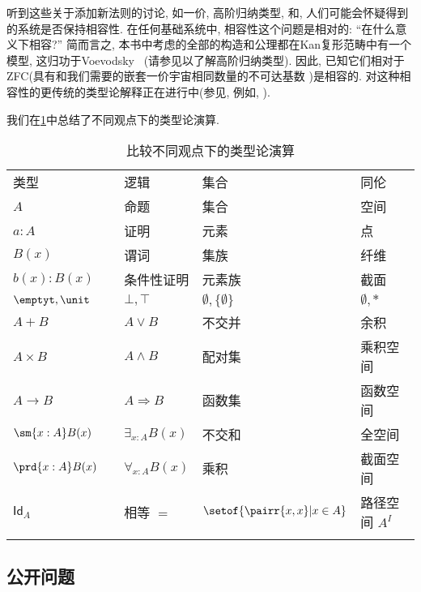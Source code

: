 听到这些关于添加新法则的讨论, 如一价, 高阶归纳类型, \choice{}和\LEM{}, 人们可能会怀疑得到的系统是否保持相容性. 
在任何基础系统中, 相容性这个问题是相对的: ``在什么意义下相容?''
简而言之, 本书中考虑的全部的构造和公理都在Kan复形范畴中有一个模型, 这归功于Voevodsky~\cite{klv:ssetmodel} (请参见\cite{ls:hits}以了解高阶归纳类型). 
因此, 已知它们相对于ZFC(具有和我们需要的嵌套一价宇宙相同数量的不可达基数
%
)是相容的. 
对这种相容性的更传统的类型论解释正在进行中(参见, 例如, \cite{lh:canonicity,coquand2012constructive}). 

我们在\cref{tab:pov}中总结了不同观点下的类型论演算. 

\begin{table}[htb]
  \centering
  \OPTsmalltable
 \begin{tabular}{lllll}
    \toprule
       类型 && 逻辑 & 集合 & 同伦\\ \addlinespace[2pt]
    \midrule
       $A$ && 命题 & 集合 & 空间\\ \addlinespace[2pt]
       $a:A$ && 证明 & 元素 & 点 \\ \addlinespace[2pt]
       $B(x)$ && 谓词 & 集族 & 纤维 \\ \addlinespace[2pt]
       $b(x) : B(x)$ && 条件性证明 & 元素族 & 截面\\ \addlinespace[2pt]
       $\emptyt, \unit$ && $\bot, \top$ & $\emptyset, \{ \emptyset \}$ & $\emptyset, *$\\ \addlinespace[2pt]
       $A + B$ && $A\vee B$ & 不交并 & 余积\\ \addlinespace[2pt]
       $A\times B$ && $A\wedge B$ & 配对集 & 乘积空间\\ \addlinespace[2pt]
       $A\to B$ && $A\Rightarrow B$ & 函数集 & 函数空间\\ \addlinespace[2pt]
       $\sm{x:A}B(x)$ &&  $\exists_{x:A}B(x)$ & 不交和 & 全空间\\ \addlinespace[2pt]
       $\prd{x:A}B(x)$ &&  $\forall_{x:A}B(x)$ & 乘积 & 截面空间\\ \addlinespace[2pt]
       $\mathsf{Id}_{A}$ && 相等 $=$ & $\setof{\pairr{x,x} | x\in A}$ & 路径空间 $A^I$ \\ \addlinespace[2pt]
    \bottomrule
  \end{tabular}
  \caption{比较不同观点下的类型论演算}\label{tab:pov}
\end{table}

%

\subsection*{公开问题} 


